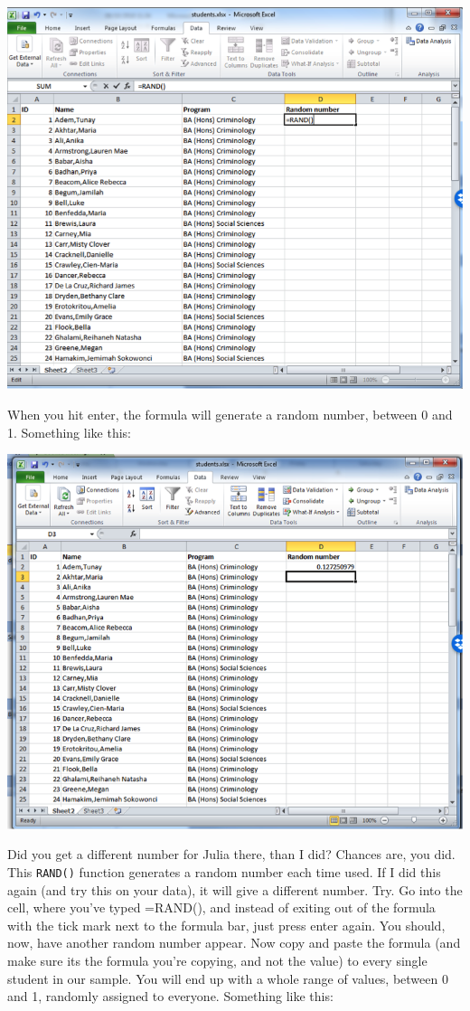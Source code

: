 \documentclass[]{book}
\theoremstyle{definition}
\theoremstyle{definition}
\theoremstyle{definition}
\theoremstyle{remark}
\begin{document}
\includegraphics{imgs/type_rand.png}

When you hit enter, the formula will generate a random number, between 0
and 1. Something like this:

\includegraphics{imgs/first_rand.png}

Did you get a different number for Julia there, than I did? Chances are,
you did. This \texttt{RAND()} function generates a random number each
time used. If I did this again (and try this on your data), it will give
a different number. Try. Go into the cell, where you've typed =RAND(),
and instead of exiting out of the formula with the tick mark next to the
formula bar, just press enter again. You should, now, have another
random number appear. Now copy and paste the formula (and make sure its
the formula you're copying, and not the value) to every single student
in our sample. You will end up with a whole range of values, between 0
and 1, randomly assigned to everyone. Something like this:
\end{document}
